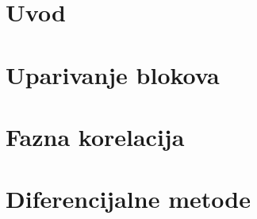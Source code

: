 \section{Uvod}


\section{Uparivanje blokova}


\section{Fazna korelacija}


\section{Diferencijalne metode}
